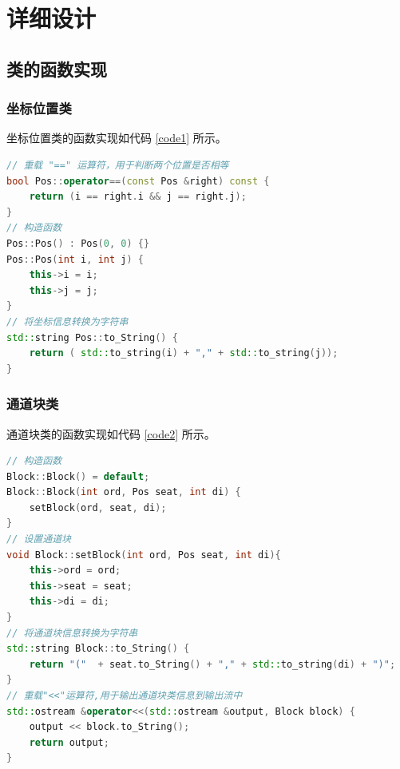 \documentclass{ctexart}
\begin{document}
\begin{enumerate}
\begin{algorithm}[htp]
        \end{algorithm}
    \end{enumerate}

    \section{详细设计}

    \subsection{类的函数实现}
    
    \subsubsection{坐标位置类}

    坐标位置类的函数实现如代码 \ref{code1} 所示。
\begin{lstlisting}[language=C++,caption=Pos类的实现,label=code1]
// 重载 "==" 运算符，用于判断两个位置是否相等
bool Pos::operator==(const Pos &right) const {
    return (i == right.i && j == right.j);
}
// 构造函数
Pos::Pos() : Pos(0, 0) {}
Pos::Pos(int i, int j) {
    this->i = i;
    this->j = j;
}
// 将坐标信息转换为字符串
std::string Pos::to_String() {
    return ( std::to_string(i) + "," + std::to_string(j));
}
\end{lstlisting}


    \subsubsection{通道块类}
    通道块类的函数实现如代码 \ref{code2} 所示。
\begin{lstlisting}[language=C++,caption=Block类的实现,label=code2]
// 构造函数
Block::Block() = default;
Block::Block(int ord, Pos seat, int di) {
    setBlock(ord, seat, di);
}
// 设置通道块
void Block::setBlock(int ord, Pos seat, int di){
    this->ord = ord;
    this->seat = seat;
    this->di = di;
}
// 将通道块信息转换为字符串
std::string Block::to_String() {
    return "("  + seat.to_String() + "," + std::to_string(di) + ")";
}
// 重载"<<"运算符,用于输出通道块类信息到输出流中
std::ostream &operator<<(std::ostream &output, Block block) {
    output << block.to_String();
    return output;
} 
\end{lstlisting}
\end{document}
